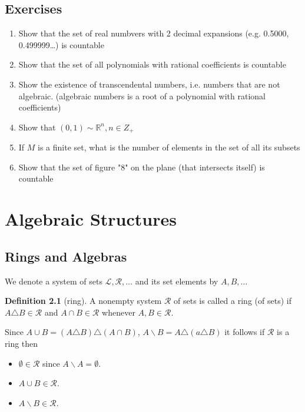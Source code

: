 \documentclass[11pt,a4paper]{report}
\theoremstyle{plain}
\theoremstyle{definition}
\newtheorem*{defn}{Definition}
\theoremstyle{remark}
\newcommand{\union}{\cup}
\newcommand{\R}{\mathbb{R}}
\newcommand{\cL}{\mathcal{L}}
\newcommand{\cR}{\mathcal{R}}
\begin{document}
\section{Exercises}
\begin{enumerate}

  \item Show that the set of real numbvers with 2 decimal expansions (e.g. 0.5000, 0.499999\dots) is countable

  \item Show that the set of all polynomials with rational coefficients is countable

  \item Show the existence of transcendental numbers, i.e. numbers that are not algebraic. (algebraic numbers is a root of a polynomial with rational coefficients)

  \item Show that $(0,1) \sim \R^n, n\in Z_+$

  \item If $M$ is a finite set, what is the number of elements in the set of all its subsets

  \item Show that the set of figure "8" on the plane (that intersects itself) is countable

\end{enumerate}

\chapter{Algebraic Structures}

\section{Rings and Algebras}

We denote a system of sets $\cL, \cR, \dots$ and its set elements by $A, B, \dots$

\begin{defn}[ring]
  A nonempty system $\cR$ of sets is called a ring (of sets) if $A \triangle B \in \cR$ and $A \cap B \in \cR$ whenever $A,B \in \cR$.
\end{defn}
  
Since $A \cup B = (A\triangle B)\triangle(A\cap B)$, $A \backslash B = A \triangle (a \triangle B)$ it follows if $\cR$ is a ring then
\begin{itemize}
    \item $\emptyset \in \cR$ since $A \backslash A = \emptyset$.
    \item $A \union B \in \cR$.
    \item $A \backslash B \in \cR$.
\end{itemize}
\end{document}
